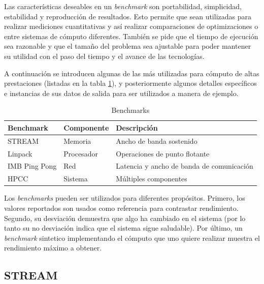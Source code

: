 \documentclass[a4paper]{report}
\begin{document}
\bigskip

Las caracter\'isticas deseables en un {\it benchmark} son portabilidad, simplicidad, estabilidad y
reproducci\'on de resultados. Esto permite que sean utilizadas para realizar
mediciones cuantitativas y as\'i realizar comparaciones de optimizaciones o
entre sistemas de c\'omputo diferentes. Tambi\'en se pide que el tiempo de
ejecuci\'on sea razonable y que el tama\~no del problema sea ajustable para
poder mantener su utilidad con el paso del tiempo y el avance de las
tecnolog\'ias.

\bigskip

A continuaci\'on se introducen algunas de las m\'as utilizadas para c\'omputo
de altas prestaciones (listadas en la tabla \ref{table:benchmark-list}),
y posteriormente algunos detalles espec\'ificos e instancias
de sus datos de salida para ser utilizados a manera de ejemplo.

\begin{table}[H]
    \caption{Benchmarks}
    \begin{center}
    \begin{tabular}{|l|l|l|}\hline
      {\bf Benchmark} & {\bf Componente} & {\bf Descripci\'on} \\ \hline
      STREAM & Memoria & Ancho de banda sostenido \\ \hline
      Linpack & Procesador & Operaciones de punto flotante \\ \hline
      IMB Ping Pong & Red & Latencia y ancho de banda de comunicaci\'on \\ \hline
      HPCC & Sistema & M\'ultiples componentes \\ \hline
        \end{tabular}
  \label{table:benchmark-list}
  \end{center}
\end{table}

\bigskip

Los {\it benchmarks} pueden ser utilizados para diferentes prop\'ositos. Primero,
los valores reportados son usados como referencia para contrastar rendimiento.
Segundo, su desviaci\'on demuestra que algo ha cambiado en el sistema (por lo tanto
su no desviaci\'on indica que el sistema sigue saludable). Por \'ultimo,
un {\it benchmark} sintetico implementando el c\'omputo que uno quiere realizar
muestra el rendimiento m\'aximo a obtener.

\subsection{STREAM}
\end{document}
